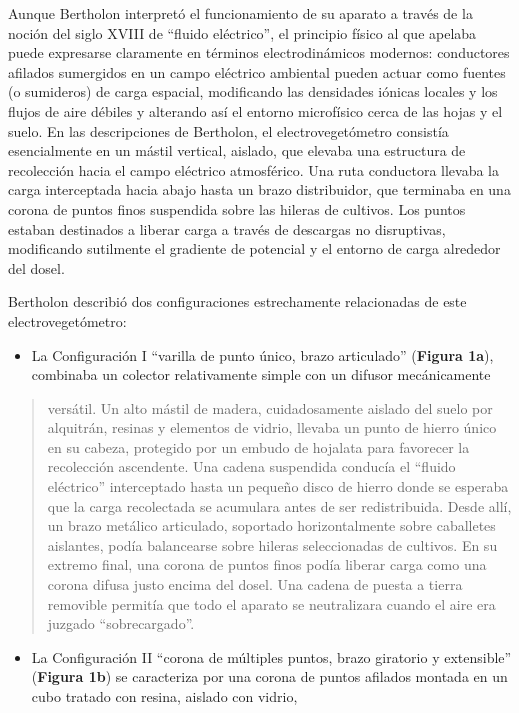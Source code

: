 \documentclass[
]{article}
\providecommand{\tightlist}{%
  \setlength{\itemsep}{0pt}\setlength{\parskip}{0pt}}
\begin{document}
Aunque Bertholon interpretó el funcionamiento de su aparato a través de
la noción del siglo XVIII de ``fluido eléctrico'', el principio físico
al que apelaba puede expresarse claramente en términos electrodinámicos
modernos: conductores afilados sumergidos en un campo eléctrico
ambiental pueden actuar como fuentes (o sumideros) de carga espacial,
modificando las densidades iónicas locales y los flujos de aire débiles
y alterando así el entorno microfísico cerca de las hojas y el suelo. En
las descripciones de Bertholon, el electrovegetómetro consistía
esencialmente en un mástil vertical, aislado, que elevaba una estructura
de recolección hacia el campo eléctrico atmosférico. Una ruta conductora
llevaba la carga interceptada hacia abajo hasta un brazo distribuidor,
que terminaba en una corona de puntos finos suspendida sobre las hileras
de cultivos. Los puntos estaban destinados a liberar carga a través de
descargas no disruptivas, modificando sutilmente el gradiente de
potencial y el entorno de carga alrededor del dosel.

Bertholon describió dos configuraciones estrechamente relacionadas de
este electrovegetómetro:

\begin{itemize}
\tightlist
\item
  La Configuración I ``varilla de punto único, brazo articulado''
  (\textbf{Figura 1a}), combinaba un colector relativamente simple con
  un difusor mecánicamente
\end{itemize}

\begin{quote}
versátil. Un alto mástil de madera, cuidadosamente aislado del suelo por
alquitrán, resinas y elementos de vidrio, llevaba un punto de hierro
único en su cabeza, protegido por un embudo de hojalata para favorecer
la recolección ascendente. Una cadena suspendida conducía el ``fluido
eléctrico'' interceptado hasta un pequeño disco de hierro donde se
esperaba que la carga recolectada se acumulara antes de ser
redistribuida. Desde allí, un brazo metálico articulado, soportado
horizontalmente sobre caballetes aislantes, podía balancearse sobre
hileras seleccionadas de cultivos. En su extremo final, una corona de
puntos finos podía liberar carga como una corona difusa justo encima del
dosel. Una cadena de puesta a tierra removible permitía que todo el
aparato se neutralizara cuando el aire era juzgado ``sobrecargado''.
\end{quote}

\begin{itemize}
\tightlist
\item
  La Configuración II ``corona de múltiples puntos, brazo giratorio y
  extensible'' (\textbf{Figura 1b}) se caracteriza por una corona de
  puntos afilados montada en un cubo tratado con resina, aislado con
  vidrio,
\end{itemize}
\end{document}
